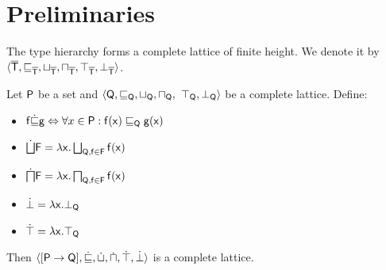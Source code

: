 \documentclass{llncs}
\begin{document}
\section{Preliminaries}

\begin{proposition}
\label{proposition:typesystem}
The type hierarchy forms a complete lattice of finite height. We denote it by $\langle \mathsf{\overline{T}}, \sqsubseteq_{\mathsf{\overline{T}}}, \sqcup_{\mathsf{\overline{T}}}, \sqcap_{\mathsf{\overline{T}}},\top_{\mathsf{\overline{T}}}, \bot_{\mathsf{\overline{T}}} \rangle$.
\end{proposition}

\begin{theorem}
\label{theorem:pointwisemap}
Let $\mathsf{P}$ be a set and $\langle \mathsf{Q}, \sqsubseteq_{\mathsf{Q}}, \sqcup_{\mathsf{Q}}, \sqcap_{\mathsf{Q}},$ $\top_{\mathsf{Q}}, \bot_{\mathsf{Q}} \rangle$ be a complete lattice. Define:
\begin{itemize}
\item $\mathsf{f} \dot{\sqsubseteq} \mathsf{g} \Leftrightarrow \forall{x} \in \mathsf{P} : \mathsf{f}(\mathsf{x}) \sqsubseteq_{\mathsf{Q}} \mathsf{g}(\mathsf{x})$
\item $\dot{\bigsqcup} \mathsf{F} = \lambda \mathsf{x} . \bigsqcup_{\mathsf{Q}, \mathsf{f} \in \mathsf{F}} \mathsf{f}(\mathsf{x})$
\item $\dot{\bigsqcap} \mathsf{F} = \lambda \mathsf{x} . \bigsqcap_{\mathsf{Q}, \mathsf{f} \in \mathsf{F}} \mathsf{f}(\mathsf{x})$
\item $\dot{\bot} = \lambda \mathsf{x} . \bot_{\mathsf{Q}}$
\item $\dot{\top} = \lambda \mathsf{x} . \top_{\mathsf{Q}}$
\end{itemize}
Then $\langle [\mathsf{P} \rightarrow\mathsf{Q}], \dot{\sqsubseteq}, \dot{\sqcup}, \dot{\sqcap}, \dot{\top}, \dot{\bot} \rangle$ is a complete lattice.
\end{theorem}
\end{document}
